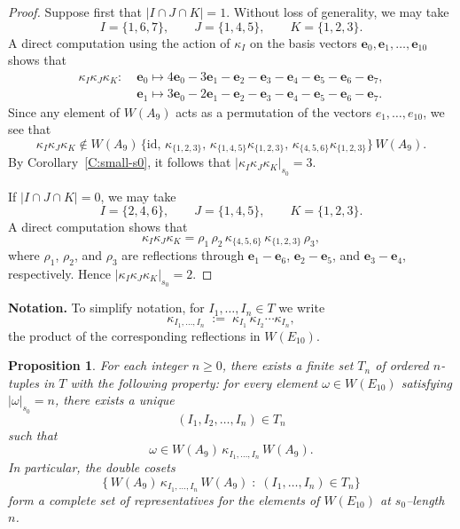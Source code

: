 \documentclass[11pt]{amsart}
\numberwithin{equation}{section}
\newtheorem{prop}[thm]{Proposition}
\newcommand{\vve}{\mathbf{e}}
\begin{document}
\begin{proof}
Suppose first that \( |I\cap J\cap K| = 1 \).
Without loss of generality, we may take
\[
I=\{1,6,7\},\qquad J=\{1,4,5\},\qquad K=\{1,2,3\}.
\]
A direct computation using the action of $\kappa_I$ on the basis vectors
\( \vve_0, \vve_1, \dots, \vve_{10}\) shows that
\[
\begin{aligned}
\kappa_I \kappa_J \kappa_K :\;
  & \vve_0 \mapsto 4 \vve_0 -3 \vve_1 - \vve_2 - \vve_3 - \vve_4 - \vve_5 - \vve_6 - \vve_7,\\
  & \vve_1 \mapsto 3 \vve_0 -2 \vve_1 - \vve_2 - \vve_3 - \vve_4 - \vve_5 - \vve_6 - \vve_7.
\end{aligned}
\]
Since any element of $W(A_9)$ acts as a permutation of the vectors
$e_1,\dots,e_{10}$, we see that
\[
\kappa_I \kappa_J \kappa_K
\notin
W(A_9)\, \{ \mathrm{id},\, \kappa_{\{1,2,3\}},\,
\kappa_{\{1,4,5\}} \kappa_{\{1,2,3\}},\,
\kappa_{\{4,5,6\}} \kappa_{\{1,2,3\}} \}\, W(A_9).
\]
By Corollary~\ref{C:small-s0}, it follows that
\( |\kappa_I \kappa_J \kappa_K|_{s_0} = 3. \)

\smallskip
If \( |I\cap J\cap K| = 0 \), we may take
\[
I=\{2,4,6\},\qquad J=\{1,4,5\},\qquad K=\{1,2,3\}.
\]
A direct computation shows that
\[
\kappa_I \kappa_J \kappa_K
 = \rho_1\, \rho_2\, \kappa_{\{4,5,6\}}\, \kappa_{\{1,2,3\}}\, \rho_3,
\]
where $\rho_1$, $\rho_2$, and $\rho_3$ are reflections through
$\vve_1-\vve_6$, $\vve_2-\vve_5$, and $\vve_3-\vve_4$, respectively.
Hence \( |\kappa_I \kappa_J \kappa_K|_{s_0} = 2. \)
\end{proof}

\medskip
\noindent
\textbf{Notation.}
To simplify notation, for $I_1,\dots,I_n \in T$ we write
\[
\kappa_{I_1,\dots,I_n}
\;:=\;
\kappa_{I_1}\,\kappa_{I_2}\cdots \kappa_{I_n},
\]
the product of the corresponding reflections in $W(E_{10})$.

\medskip
\begin{prop}\label{P:minimal-kappa}
For each integer $n \ge 0$, there exists a finite set $T_n$ of ordered $n$-tuples in $T$ with the following property:
for every element $\omega \in W(E_{10})$ satisfying $|\omega|_{s_0} = n$, there exists a unique
\[
(I_1,I_2,\dots,I_n) \in T_n
\]
such that
\[
\omega \in W(A_9)\,\kappa_{I_1,\dots,I_n}\,W(A_9).
\]
In particular, the double cosets
\[
\bigl\{\, W(A_9)\,\kappa_{I_1,\dots,I_n}\,W(A_9) \;:\; (I_1,\dots,I_n)\in T_n \bigr\}
\]
form a complete set of representatives for the elements of $W(E_{10})$ at $s_0$--length $n$.
\end{prop}
\end{document}
